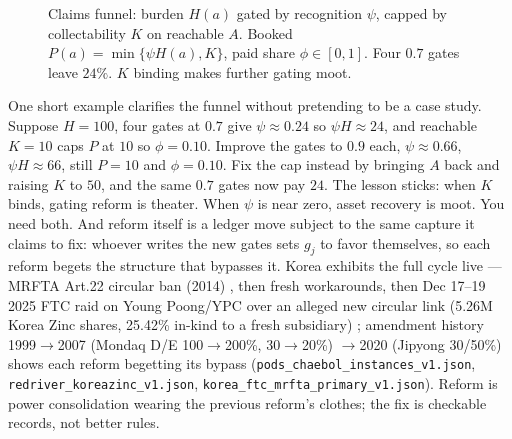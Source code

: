 \documentclass[11pt]{article}
\begin{document}
\begin{figure}[h]
\centering
{}
\caption{Claims funnel: burden $H(a)$ gated by recognition $\psi$, capped by collectability $K$ on reachable $A$. Booked $P(a)=\min\{\psi H(a),K\}$, paid share $\phi\in[0,1]$. Four $0.7$ gates leave $24\%$. $K$ binding makes further gating moot.}
\label{fig:claims}
\end{figure}

One short example clarifies the funnel without pretending to be a case study. Suppose $H=100$, four gates at $0.7$ give $\psi\approx0.24$ so $\psi H\approx24$, and reachable $K=10$ caps $P$ at $10$ so $\phi=0.10$. Improve the gates to $0.9$ each, $\psi\approx0.66$, $\psi H\approx66$, still $P=10$ and $\phi=0.10$. Fix the cap instead by bringing $A$ back and raising $K$ to $50$, and the same $0.7$ gates now pay $24$. The lesson sticks: when $K$ binds, gating reform is theater. When $\psi$ is near zero, asset recovery is moot. You need both. And reform itself is a ledger move subject to the same capture it claims to fix: whoever writes the new gates sets $g_j$ to favor themselves, so each reform begets the structure that bypasses it. Korea exhibits the full cycle live --- MRFTA Art.22 circular ban (2014) \citep{klri2022mrfta}, then fresh workarounds, then Dec 17--19 2025 FTC raid on Young Poong/YPC over an alleged new circular link (5.26M Korea Zinc shares, 25.42\% in-kind to a fresh subsidiary) \citep{kftc2024large}; amendment history 1999$\to$2007 (Mondaq D/E 100$\to$200\%, 30$\to$20\%) $\to$2020 (Jipyong 30/50\%) shows each reform begetting its bypass (\texttt{pods\_chaebol\_instances\_v1.json}, \texttt{redriver\_koreazinc\_v1.json}, \texttt{korea\_ftc\_mrfta\_primary\_v1.json}). Reform is power consolidation wearing the previous reform's clothes; the fix is checkable records, not better rules.
\end{document}
